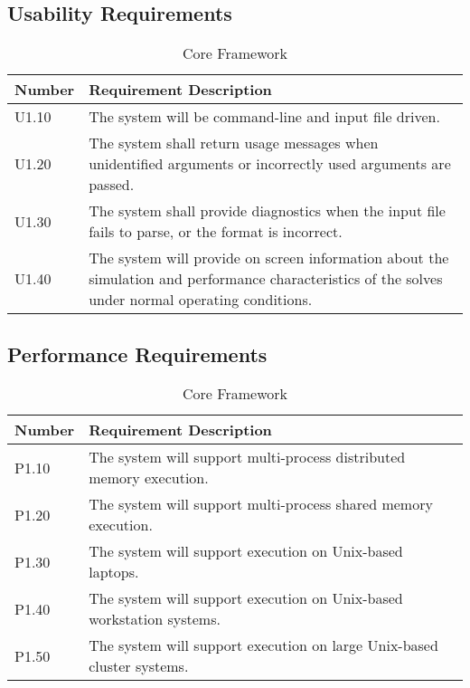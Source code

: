 \documentclass{INLreport}
\begin{document}
\subsection{Usability Requirements}

\begin{table}[!htbp]
  \caption{Core Framework\label{tab:usabilty_core}}
  \begin{tabular}{|l|p{12cm}|}
    \rowcolor{gray}
    Number & Requirement Description \\ \hline
    U1.10 & The system will be command-line and input file driven. \\ \hline
    U1.20 & The system shall return usage messages when unidentified arguments or incorrectly used arguments are passed. \\ \hline
    U1.30 & The system shall provide diagnostics when the input file fails to parse, or the format is incorrect. \\ \hline
    U1.40 & The system will provide on screen information about the simulation and performance characteristics of the solves under normal operating conditions. \\ \hline
  \end{tabular}
\end{table}

\clearpage

    \subsection{Performance Requirements}

\begin{table}[!htbp]
  \caption{Core Framework\label{tab:perf_core}}
  \begin{tabular}{|l|p{12cm}|}
    \rowcolor{gray}
    Number & Requirement Description \\ \hline
    P1.10 & The system will support multi-process distributed memory execution. \\ \hline
    P1.20 & The system will support multi-process shared memory execution. \\ \hline
    P1.30 & The system will support execution on Unix-based laptops. \\ \hline
    P1.40 & The system will support execution on Unix-based workstation systems. \\ \hline
    P1.50 & The system will support execution on large Unix-based cluster systems. \\ \hline
  \end{tabular}
\end{table}
\end{document}

